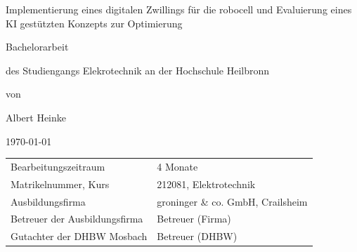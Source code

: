 \begin{titlepage}

\begin{singlespace}
    




\vspace{1cm}
\centering
\fontsize{30}{27} \selectfont Implementierung eines digitalen Zwillings für die robocell und Evaluierung eines KI gestützten Konzepts zur Optimierung  
 \par
\vspace{1.5cm}
\fontsize{36}{33} \selectfont Bachelorarbeit \par
\vspace{1.5cm}
\fontsize{16}{20} \selectfont  des Studiengangs Elekrotechnik
an der Hochschule Heilbronn
\vspace{1.5cm}

\fontsize{18}{22} \selectfont von \par
\fontsize{20}{25} \selectfont Albert Heinke\par
\vspace{1.5cm}
\fontsize{18}{22} \selectfont \today \par
\vfill

\fontsize{13}{18} \selectfont
\begin{tabular}{ l  l }
  Bearbeitungszeitraum & \hspace{0.85cm} 4 Monate \\
  Matrikelnummer, Kurs & \hspace{0.85cm} 212081, Elektrotechnik \\
  Ausbildungsfirma & \hspace{0.85cm} groninger \& co. GmbH, Crailsheim \\
  Betreuer der Ausbildungsfirma & \hspace{0.85cm} Betreuer (Firma) \\
  Gutachter der DHBW Mosbach & \hspace{0.85cm} Betreuer (DHBW) \\
\end{tabular}


\end{singlespace}
\end{titlepage}
